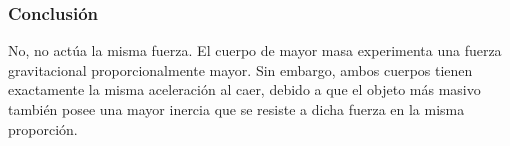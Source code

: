 \documentclass[12pt]{article}
\begin{document}
\subsubsection*{Conclusión}
No, no actúa la misma fuerza. El cuerpo de mayor masa experimenta una fuerza gravitacional proporcionalmente mayor. Sin embargo, ambos cuerpos tienen exactamente la misma aceleración al caer, debido a que el objeto más masivo también posee una mayor inercia que se resiste a dicha fuerza en la misma proporción.
\end{document}
